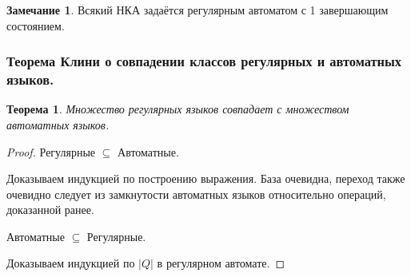 \documentclass[a4paper,12pt]{article}
\theoremstyle{plain}
\newtheorem{theorem}{Теорема}[subsection]
\theoremstyle{definition}
\newtheorem*{note}{Замечание}
\theoremstyle{remark}
\begin{document}
\begin{note}
	Всякий НКА задаётся регулярным автоматом с 1 завершающим состоянием.
\end{note}

\subsubsection*{Теорема Клини о совпадении классов регулярных и автоматных языков.}
\begin{theorem}
	Множество регулярных языков совпадает с множеством автоматных языков.
\end{theorem}
\begin{proof}
	Регулярные $\subseteq$ Автоматные.

	Доказываем индукцией по построению выражения. База очевидна, переход также очевидно следует из замкнутости автоматных языков относительно операций, доказанной ранее.

	Автоматные $\subseteq$ Регулярные.

	Доказываем индукцией по $|Q|$ в регулярном автомате.
\end{proof}
\end{document}
